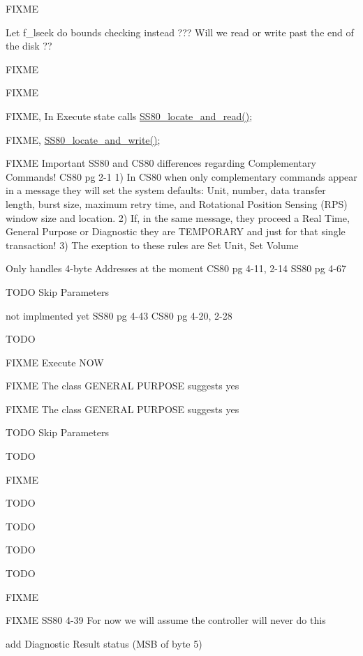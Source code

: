 \begin{DoxyRefList}
F\+I\+X\+ME  
\item[\label{todo__todo000058}%
\hypertarget{todo__todo000058}{}%
Global \hyperlink{ss80_8h_a0d2e3b28c642ea89fea6ff6f8ced5a3b}{S\+S80\+\_\+cmd\+\_\+seek} (void)]Let f\+\_\+lseek do bounds checking instead ??? Will we read or write past the end of the disk ??  
\item[\label{todo__todo000030}%
\hypertarget{todo__todo000030}{}%
Global \hyperlink{ss80_8h_a98c1da720b6dbe5ee9f13b914a913e17}{S\+S80\+\_\+\+Command\+\_\+\+State} (void)]F\+I\+X\+ME 

F\+I\+X\+ME 

F\+I\+X\+ME, In Execute state calls \hyperlink{ss80_8c_acad6de863f4566b55cb8860eb1ffd09c}{S\+S80\+\_\+locate\+\_\+and\+\_\+read()}; 

F\+I\+X\+ME, \hyperlink{ss80_8c_a41ef37ec5419463815401485cfcb62b1}{S\+S80\+\_\+locate\+\_\+and\+\_\+write()}; 

F\+I\+X\+ME Important S\+S80 and C\+S80 differences regarding Complementary Commands! C\+S80 pg 2-\/1 1) In C\+S80 when only complementary commands appear in a message they will set the system defaults\+: Unit, number, data transfer length, burst size, maximum retry time, and Rotational Position Sensing (R\+PS) window size and location. 2) If, in the same message, they proceed a Real Time, General Purpose or Diagnostic they are T\+E\+M\+P\+O\+R\+A\+RY and just for that single transaction! 3) The exeption to these rules are Set Unit, Set Volume 

Only handles 4-\/byte Addresses at the moment C\+S80 pg 4-\/11, 2-\/14 S\+S80 pg 4-\/67 

T\+O\+DO Skip Parameters 

not implmented yet S\+S80 pg 4-\/43 C\+S80 pg 4-\/20, 2-\/28 

T\+O\+DO 

F\+I\+X\+ME Execute N\+OW 

F\+I\+X\+ME The class G\+E\+N\+E\+R\+AL P\+U\+R\+P\+O\+SE suggests yes 

F\+I\+X\+ME The class G\+E\+N\+E\+R\+AL P\+U\+R\+P\+O\+SE suggests yes 

T\+O\+DO Skip Parameters 

T\+O\+DO 

F\+I\+X\+ME 

T\+O\+DO 

T\+O\+DO 

T\+O\+DO 

T\+O\+DO  
\item[\label{todo__todo000026}%
\hypertarget{todo__todo000026}{}%
Global \hyperlink{ss80_8h_a46587aecd8aff545fb96ef5b308f28ff}{S\+S80\+\_\+init} (void)]F\+I\+X\+ME  
\item[\label{todo__todo000027}%
\hypertarget{todo__todo000027}{}%
Global \hyperlink{ss80_8h_acad6de863f4566b55cb8860eb1ffd09c}{S\+S80\+\_\+locate\+\_\+and\+\_\+read} (void)]F\+I\+X\+ME S\+S80 4-\/39 For now we will assume the controller will never do this  
\item[\label{todo__todo000028}%
\hypertarget{todo__todo000028}{}%
Global \hyperlink{ss80_8h_ac4c1287b3b8b6a51f5b79522c62d4cea}{S\+S80\+\_\+send\+\_\+status} (void)]add Diagnostic Result status (M\+SB of byte 5) 


\end{DoxyRefList}
